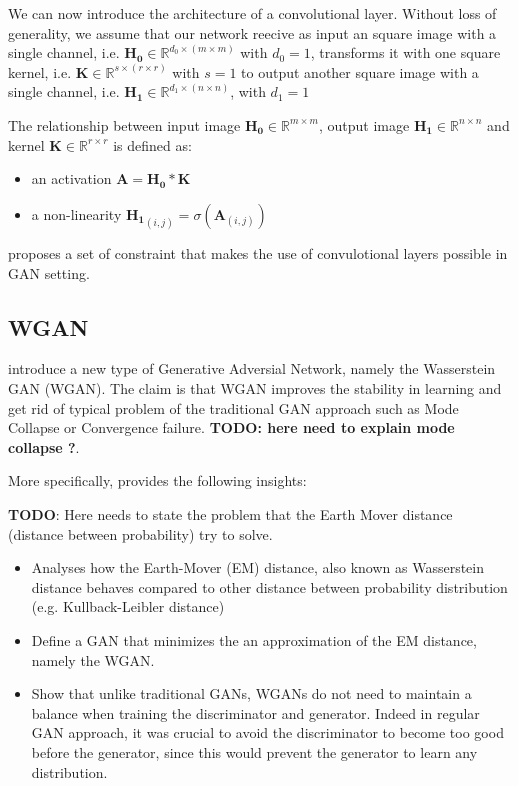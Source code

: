 \documentclass{article}
\begin{document}
We can now introduce the architecture of a convolutional layer. Without loss of generality, we assume that our network reecive as input an square image with a single channel, i.e. $\mathbf{H_0} \in \mathbb{R}^{d_0 \times (m \times m)}$ with $d_0 = 1$, transforms it with one square kernel, i.e. $\mathbf{K} \in \mathbb{R}^{s \times (r \times r)}$ with $s = 1$ to output another square image with a single channel, i.e. $\mathbf{H_1} \in \mathbb{R}^{d_1 \times (n \times n)}$, with $d_1 = 1$

The relationship between input image $\mathbf{H_0} \in \mathbb{R}^{m \times m}$, output image $\mathbf{H_1} \in \mathbb{R}^{n \times n}$ and kernel $\mathbf{K} \in \mathbb{R}^{r \times r}$ is defined as:


\begin{itemize} 
    \item an activation $\mathbf{A} = \mathbf{H_0} \ast \mathbf{K}$
    \item a non-linearity $\mathbf{H_1}_{(i,j)} = \sigma(\mathbf{A}_{(i,j)})$ 
\end{itemize}

\cite{radford2015unsupervised} proposes a set of constraint that makes the use of convulotional layers possible in GAN setting.


\subsection{WGAN}

\cite{arjovsky2017wasserstein} introduce a new type of Generative Adversial Network, namely the Wasserstein GAN (WGAN). The claim is that WGAN improves the stability in learning and get rid of typical problem of the traditional GAN approach such as Mode Collapse or Convergence failure. \textbf{TODO: here need to explain mode collapse ?}. 


More specifically, \cite{arjovsky2017wasserstein} provides the following insights:

\textbf{TODO}: Here needs to state the problem that the Earth Mover distance (distance between probability) try to solve.

\begin{itemize}
    \item Analyses how the Earth-Mover (EM) distance, also known as Wasserstein distance behaves compared to other distance between probability distribution (e.g. Kullback-Leibler distance)
    \item Define a GAN that minimizes the an approximation of the EM distance, namely the WGAN.
    \item Show that unlike traditional GANs, WGANs do not need to maintain a balance when training the discriminator and generator. Indeed in regular GAN approach, it was crucial to avoid the discriminator to become too good before the generator, since this would prevent the generator to learn any distribution. 
\end{itemize}
\end{document}
